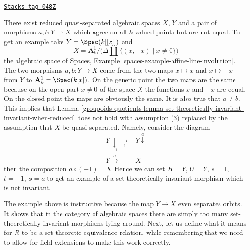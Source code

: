 \begin{example}
\label{groupoids-quotients-example-not-invariant}
\href{https://stacks.math.columbia.edu/tag/048Z}{\texttt{Stacks tag 048Z}}

There exist reduced quasi-separated algebraic spaces $X$, $Y$ and a pair of
morphisms $a, b : Y \to X$ which agree on all $k$-valued points but are not
equal. To get an example take $Y = \Spec(k[[x]])$ and
$$
X = \mathbf{A}^1_k \Big/ \big(\Delta \amalg \{(x, -x) \mid x \not = 0\}\big)
$$
the algebraic space of
Spaces, Example \ref{spaces-example-affine-line-involution}.
The two morphisms $a, b : Y \to X$
come from the two maps $x \mapsto x$ and $x \mapsto -x$
from $Y$ to $\mathbf{A}^1_k = \Spec(k[x])$. On the generic point
the two maps are the same because on the open part $x \not = 0$ of the
space $X$ the functions $x$ and $-x$ are equal. On the closed point
the maps are obviously the same. It is also true that $a \not = b$.
This implies that
Lemma \ref{groupoids-quotients-lemma-set-theoretically-invariant-invariant-when-reduced}
does not hold with assumption (3) replaced by the assumption that $X$
be quasi-separated. Namely, consider the diagram
$$
\begin{array}{cc}Y \underset{-1}{\downarrow}\underset{1}{\longrightarrow} & Y \overset{a}{\downarrow} \\ Y \overset{a}{\longrightarrow} & X\end{array}
$$
then the composition $a \circ (-1) = b$. Hence we can set $R = Y$,
$U = Y$, $s = 1$, $t = -1$, $\phi = a$ to get an example of a set-theoretically
invariant morphism which is not invariant.
\end{example}

The example above is instructive because the map $Y \to X$ even separates
orbits. It shows that in the category of algebraic spaces there are simply
too many set-theoretically invariant morphisms lying around. Next, let us
define what it means for $R$ to be a set-theoretic equivalence relation, while
remembering that we need to allow for field extensions to make this work
correctly.

